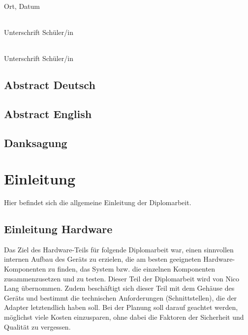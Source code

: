 \documentclass[]{article}
\begin{document}
\vspace{30mm}

\noindent
\begin{minipage}[c]{5cm}
	\centering \dotfill \\
	Ort, Datum
\end{minipage}
\hfill
    \begin{minipage}[c]{5cm}
        \centering \dotfill \\
        Unterschrift Schüler/in
    \end{minipage}
    
\vspace{10mm}

\noindent
\begin{flushright}
    \begin{minipage}[c]{5cm}
        \centering \dotfill \\
        Unterschrift Schüler/in
    \end{minipage}
\end{flushright}

\pagebreak

\subsection{Abstract Deutsch}
\subsection{Abstract English}
\subsection{Danksagung}

\tableofcontents

\section{Einleitung}
Hier befindet sich die allgemeine Einleitung der Diplomarbeit.

\subsection{Einleitung Hardware}
Das Ziel des Hardware-Teils für folgende Diplomarbeit war, einen sinnvollen internen Aufbau des Geräts zu erzielen, die am besten geeigneten Hardware-Komponenten zu finden, das System bzw. die einzelnen Komponenten zusammenzusetzen und zu testen. Dieser Teil der Diplomarbeit wird von Nico Lang übernommen.
Zudem beschäftigt sich dieser Teil mit dem Gehäuse des Geräts und bestimmt die technischen Anforderungen (Schnittstellen), die der Adapter letztendlich haben soll. 
Bei der Planung soll darauf geachtet werden, möglichst viele Kosten einzusparen, ohne dabei die Faktoren der Sicherheit und Qualität zu vergessen.
\end{document}
